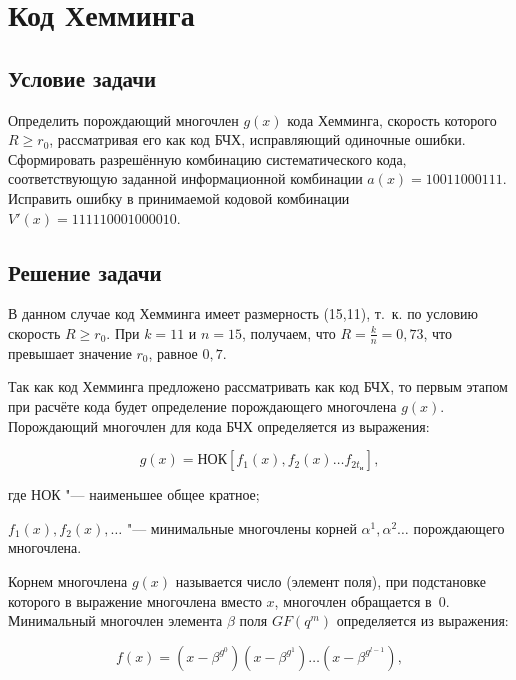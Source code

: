 \section{Код Хемминга}
\label{sec:hemming}

\subsection{Условие задачи}

Определить порождающий многочлен $g(x)$ кода Хемминга, скорость
которого $R \geqslant r_0$, рассматривая его как код БЧХ, исправляющий
одиночные ошибки. Сформировать разрешённую комбинацию систематического
кода, соответствующую заданной информационной комбинации $a(x) =
10011000111$. Исправить ошибку в принимаемой кодовой комбинации
$V'(x) = 111110001000010$.

\subsection{Решение задачи}

В данном случае код Хемминга имеет размерность (15,11), т.~к. по
условию скорость $R \geqslant r_0$. При $k = 11$ и $n = 15$, получаем,
что $R = \frac{k}{n} = 0{,}73$, что превышает значение $r_0$, равное
$0{,}7$.

Так как код Хемминга предложено рассматривать как код БЧХ, то первым
этапом при расчёте кода будет определение порождающего многочлена
$g(x)$. Порождающий многочлен для кода БЧХ определяется из выражения:

\begin{equation*}
  g(x) = \text{НОК}\left[f_1(x), f_2(x) \ldots f_{2t_{\text{и}}} \right],
\end{equation*}

\begin{ESKDexplanation}
\item[где ] НОК "--- наименьшее общее кратное;
\item $f_1(x), f_2(x), \ldots$ "--- минимальные многочлены корней
  $\alpha^1, \alpha^2 \ldots$ порождающего многочлена.
\end{ESKDexplanation}

Корнем многочлена $g(x)$ называется число (элемент поля), при
подстановке которого в выражение многочлена вместо $x$, многочлен
обращается в~0. Минимальный многочлен элемента $\beta$ поля $GF(q^m)$
определяется из выражения:

\begin{equation*}
  f(x) = (x - \beta^{g^0})(x - \beta^{g^1}) \ldots (x - \beta^{g^{l-1}}),
\end{equation*}

